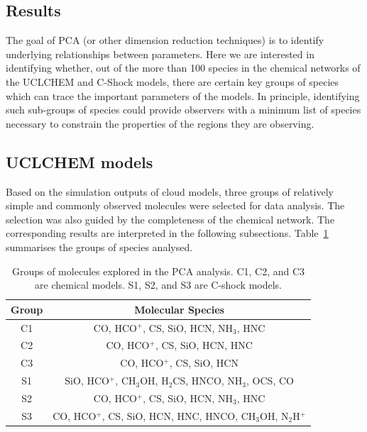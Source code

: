 \documentclass{aa}
\begin{document}
\begin{CJK*}{UTF8}{gbsn}
\section{Results}

    The goal of PCA (or other dimension reduction techniques) is to identify underlying relationships between parameters. Here we are interested in identifying whether, out of the more than 100 species in the chemical networks of the UCLCHEM and C-Shock models, there are certain key groups of species which can trace the important parameters of the models. In principle, identifying such sub-groups of species could provide observers with a minimum list of species necessary to constrain the properties  of the regions they are observing.  

\subsection{UCLCHEM models}

  Based on the simulation outputs of cloud models, three groups of relatively simple and commonly observed molecules were  selected for data analysis. The selection was also guided by the completeness of the chemical network. The corresponding results are interpreted in the following subsections. Table~\ref{tab:molegroups} summarises the groups of species analysed.
 
    \begin{table}[htbp]
        \centering
        \begin{tabular}{ccccccccc}
        \hline\hline
        Group & \multicolumn{8}{c}{Molecular Species}                         \\ \hline
        C1    & \multicolumn{8}{c}{CO, HCO$^+$, CS, SiO, HCN, NH$_3$, HNC}          \\
        C2    & \multicolumn{8}{c}{CO, HCO$^+$, CS, SiO, HCN, HNC}         \\
        C3    & \multicolumn{8}{c}{CO, HCO$^+$, CS, SiO, HCN}         \\
        S1    & \multicolumn{8}{c}{SiO, HCO$^+$, CH$_3$OH, H$_2$CS, HNCO, NH$_3$, OCS, CO} \\
        S2    & \multicolumn{8}{c}{CO, HCO$^+$, CS, SiO, HCN, NH$_3$, HNC}         \\
        S3    & \multicolumn{8}{c}{CO, HCO$^+$, CS, SiO, HCN, HNC, HNCO, CH$_3$OH, N$_2$H$^+$}      \\
        \hline\hline
        \end{tabular}
        \caption{Groups of molecules explored in the PCA analysis. C1, C2, and C3 are chemical models. S1, S2, and S3 are C-shock models.}
        \label{tab:molegroups}
    \end{table}


\end{CJK*}
\end{document}
